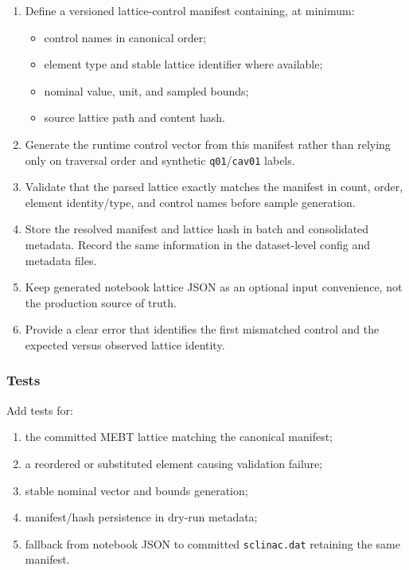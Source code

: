 \documentclass[
]{article}
\providecommand{\tightlist}{%
  \setlength{\itemsep}{0pt}\setlength{\parskip}{0pt}}
\begin{document}
\begin{enumerate}
\def\labelenumi{\arabic{enumi}.}
\tightlist
\item
  Define a versioned lattice-control manifest containing, at minimum:

  \begin{itemize}
  \tightlist
  \item
    control names in canonical order;
  \item
    element type and stable lattice identifier where available;
  \item
    nominal value, unit, and sampled bounds;
  \item
    source lattice path and content hash.
  \end{itemize}
\item
  Generate the runtime control vector from this manifest rather than
  relying only on traversal order and synthetic
  \texttt{q01}/\texttt{cav01} labels.
\item
  Validate that the parsed lattice exactly matches the manifest in
  count, order, element identity/type, and control names before sample
  generation.
\item
  Store the resolved manifest and lattice hash in batch and consolidated
  metadata. Record the same information in the dataset-level config and
  metadata files.
\item
  Keep generated notebook lattice JSON as an optional input convenience,
  not the production source of truth.
\item
  Provide a clear error that identifies the first mismatched control and
  the expected versus observed lattice identity.
\end{enumerate}

\hypertarget{tests-10}{%
\subsubsection{Tests}\label{tests-10}}

Add tests for:

\begin{enumerate}
\def\labelenumi{\arabic{enumi}.}
\tightlist
\item
  the committed MEBT lattice matching the canonical manifest;
\item
  a reordered or substituted element causing validation failure;
\item
  stable nominal vector and bounds generation;
\item
  manifest/hash persistence in dry-run metadata;
\item
  fallback from notebook JSON to committed \texttt{sclinac.dat}
  retaining the same manifest.
\end{enumerate}
\end{document}
